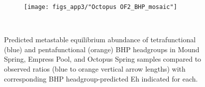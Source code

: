 \newpage

\begin{figure}[h]\ContinuedFloat
    \begin{subfigure}[b]{\linewidth}
        \texttt{[image: figs\_app3/"Octopus OF2\_BHP\_mosaic"]}
        \label{fig:OS2_degform}
    \end{subfigure}\\[-4ex]

\caption[Predicted metastable equilibrium abundance of tetrafunctional and pentafunctional BHP headgroups in Mound Spring, Empress Pool, and Octopus Spring samples]{Predicted metastable equilibrium abundance of tetrafunctional (blue) and pentafunctional (orange) BHP headgroups in Mound Spring, Empress Pool, and Octopus Spring samples compared to observed ratios (blue to orange vertical arrow lengths) with corresponding BHP headgroup-predicted Eh indicated for each.}
\label{fig:BHP_degree_formation}
\end{figure}
